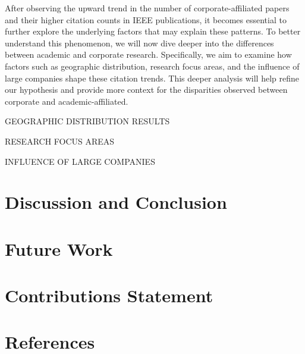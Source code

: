 \documentclass{article}
\begin{document}
After observing the upward trend in the number of corporate-affiliated papers and their higher citation counts in IEEE publications, it becomes essential to further explore the underlying factors that may explain these patterns. To better understand this phenomenon, we will now dive deeper into the differences between academic and corporate research. Specifically, we aim to examine how factors such as geographic distribution, research focus areas, and the influence of large companies shape these citation trends. This deeper analysis will help refine our hypothesis and provide more context for the disparities observed between corporate and academic-affiliated.

GEOGRAPHIC DISTRIBUTION RESULTS

RESEARCH FOCUS AREAS

INFLUENCE OF LARGE COMPANIES 

\section{Discussion and Conclusion}

\section{Future Work}

\section{Contributions Statement}



\section*{References}
\end{document}
